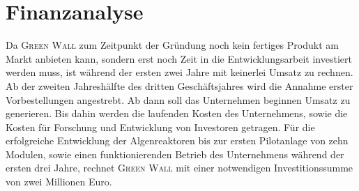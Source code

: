 \chapter{Finanzanalyse}

    Da \textsc{Green Wall} zum Zeitpunkt der Gründung noch kein fertiges Produkt am Markt anbieten kann, sondern erst noch Zeit in die Entwicklungsarbeit investiert werden muss, ist während der ersten zwei Jahre mit keinerlei Umsatz zu rechnen.
    Ab der zweiten Jahreshälfte des dritten Geschäftsjahres wird die Annahme erster Vorbestellungen angestrebt.
    Ab dann soll das Unternehmen beginnen Umsatz zu generieren.
    Bis dahin werden die laufenden Kosten des Unternehmens, sowie die Kosten für Forschung und Entwicklung von Investoren getragen.
    Für die erfolgreiche Entwicklung der Algenreaktoren bis zur ersten Pilotanlage von zehn Modulen, sowie einen funktionierenden Betrieb des Unternehmens während der ersten drei Jahre, rechnet \textsc{Green Wall} mit einer notwendigen Investitionssumme von zwei Millionen Euro.